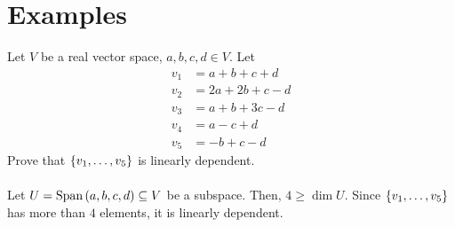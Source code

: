 \documentclass[letterpaper,12pt]{article}
\begin{document}
\section*{Examples}
\begin{example}
Let $V$ be a real vector space, $a, b, c, d \in V$. Let
\begin{align*}
    v_1 & = a + b + c + d \\
    v_2 & = 2a + 2b + c - d \\
    v_3 & = a + b + 3c - d \\
    v_4 & = a - c + d \\
    v_5 & = -b + c - d
\end{align*}
Prove that $\left\{ v_1, \dots, v_5 \right\}$ is linearly dependent.
\\ \\ Let $U = \text{Span}\left(a, b, c, d \right) \subseteq V$ be a subspace. Then, $4 \geq \dim{U}$. Since $\left\{ v_1, \dots, v_5 \right\}$ has more than $4$ elements, it is linearly dependent.
\end{example}
\end{document}
